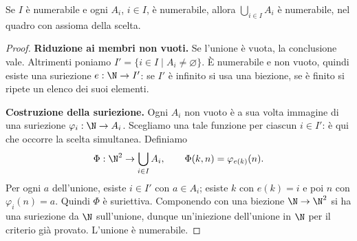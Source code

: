 \begin{schema}
\end{schema}

\begin{teorema}\label{teo:unione-numerabile}
Se $I$ è numerabile e ogni $A_i$, $i\in I$, è numerabile, allora $\bigcup_{i\in I}A_i$ è numerabile, nel quadro con assioma della scelta.
\end{teorema}
\begin{proof}
\textbf{Riduzione ai membri non vuoti.} Se l'unione è vuota, la conclusione vale. Altrimenti poniamo $I'=\{i\in I\mid A_i\ne\varnothing\}$. È numerabile e non vuoto, quindi esiste una suriezione $e:\N\to I'$: se $I'$ è infinito si usa una biezione, se è finito si ripete un elenco dei suoi elementi.

\textbf{Costruzione della suriezione.} Ogni $A_i$ non vuoto è a sua volta immagine di una suriezione $\varphi_i:\N\to A_i$. Scegliamo una tale funzione per ciascun $i\in I'$: è qui che occorre la scelta simultanea. Definiamo
\[
\Phi:\N^2\to\bigcup_{i\in I}A_i,\qquad \Phi(k,n)=\varphi_{e(k)}(n).
\]
Per ogni $a$ dell'unione, esiste $i\in I'$ con $a\in A_i$; esiste $k$ con $e(k)=i$ e poi $n$ con $\varphi_i(n)=a$. Quindi $\Phi$ è suriettiva. Componendo con una biezione $\N\to\N^2$ si ha una suriezione da $\N$ sull'unione, dunque un'iniezione dell'unione in $\N$ per il criterio già provato. L'unione è numerabile.
\end{proof}

